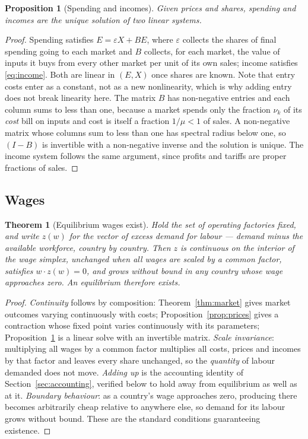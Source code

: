 \documentclass[11pt]{article}
\theoremstyle{plain}
\newtheorem{theorem}{Theorem}
\newtheorem{proposition}{Proposition}
\theoremstyle{remark}
\theoremstyle{definition}
\begin{document}
\begin{proposition}[Spending and incomes]\label{prop:income}
Given prices and shares, spending and incomes are the unique solution of two linear
systems.
\end{proposition}

\begin{proof}
Spending satisfies $E=\varepsilon X+BE$, where $\varepsilon$ collects the shares of
final spending going to each market and $B$ collects, for each market, the value of
inputs it buys from every other market per unit of its own sales; income satisfies
\eqref{eq:income}. Both are
linear in $(E,X)$ once shares are known. Note that entry costs enter as a constant, not
as a new nonlinearity, which is why adding entry does not break linearity here. The
matrix $B$ has non-negative entries and each column sums to less than one, because a
market spends only the fraction $\nu_k$ of its \emph{cost} bill on inputs and cost is
itself a fraction $1/\mu<1$ of sales. A non-negative matrix whose columns sum to less
than one has spectral radius below one, so $(I-B)$ is invertible with a non-negative
inverse and the solution is unique. The income system follows the same argument, since
profits and tariffs are proper fractions of sales.
\end{proof}

\subsection{Wages}

\begin{theorem}[Equilibrium wages exist]\label{thm:exist}
Hold the set of operating factories fixed, and write $z(w)$ for the vector of
excess demand for labour --- demand minus the available workforce, country by
country. Then $z$ is continuous
on the interior of the wage simplex, unchanged when all wages are scaled by a common
factor, satisfies $w\cdot z(w)=0$, and grows without bound in any country whose wage
approaches zero. An equilibrium therefore exists.
\end{theorem}

\begin{proof}
\emph{Continuity} follows by composition: Theorem~\ref{thm:market} gives market
outcomes varying continuously with costs; Proposition~\ref{prop:prices} gives a
contraction whose fixed point varies continuously with its parameters;
Proposition~\ref{prop:income} is a linear solve with an invertible matrix.
\emph{Scale invariance}: multiplying all wages by a common factor multiplies all costs,
prices and incomes by that factor and leaves every share unchanged, so the
\emph{quantity} of labour demanded does not move. \emph{Adding up} is the accounting
identity of Section~\ref{sec:accounting}, verified below to hold away from equilibrium
as well as at it. \emph{Boundary behaviour}: as a country's wage approaches zero,
producing there becomes arbitrarily cheap relative to anywhere else, so demand for its
labour grows without bound. These are the standard conditions guaranteeing existence.
\end{proof}
\end{document}
